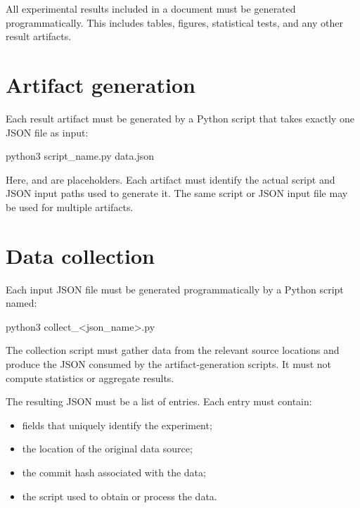 
All experimental results included in a document must be generated programmatically.
This includes tables, figures, statistical tests, and any other result artifacts.

\section*{Artifact generation}
Each result artifact must be generated by a Python script that takes exactly one JSON file as input:

\begin{DocCode}
python3 script_name.py data.json
\end{DocCode}

Here,  and  are placeholders.
Each artifact must identify the actual script and JSON input paths used to generate it.
The same script or JSON input file may be used for multiple artifacts.

\section*{Data collection}
Each input JSON file must be generated programmatically by a Python script named:

\begin{DocCode}
python3 collect_<json_name>.py
\end{DocCode}

The collection script must gather data from the relevant source locations and produce the JSON consumed by the artifact-generation scripts.
It must not compute statistics or aggregate results.

The resulting JSON must be a list of entries.
Each entry must contain:
\begin{itemize}
    \item fields that uniquely identify the experiment;
    \item the location of the original data source;
    \item the commit hash associated with the data;
    \item the script used to obtain or process the data.
\end{itemize}

